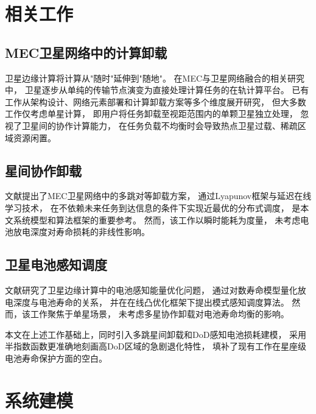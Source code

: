 \documentclass[a4paper,11pt]{article}
\begin{document}
\section{相关工作}
\label{sec:related}

\subsection{MEC卫星网络中的计算卸载}

卫星边缘计算将计算从"随时"延伸到"随地"。
在MEC与卫星网络融合的相关研究中，
卫星逐步从单纯的传输节点演变为直接处理计算任务的在轨计算平台。
已有工作从架构设计、网络元素部署和计算卸载方案等多个维度展开研究，
但大多数工作仅考虑单星计算，
即用户将任务卸载至视距范围内的单颗卫星独立处理，
忽视了卫星间的协作计算能力，
在任务负载不均衡时会导致热点卫星过载、稀疏区域资源闲置。

\subsection{星间协作卸载}

文献\cite{zhang2024mhspo}提出了MEC卫星网络中的多跳对等卸载方案，
通过Lyapunov框架与延迟在线学习技术，
在不依赖未来任务到达信息的条件下实现近最优的分布式调度，
是本文系统模型和算法框架的重要参考。
然而，该工作以瞬时能耗为度量，
未考虑电池放电深度对寿命损耗的非线性影响。

\subsection{卫星电池感知调度}

文献\cite{chen2025tasri}研究了卫星边缘计算中的电池感知能量优化问题，
通过对数寿命模型量化放电深度与电池寿命的关系，
并在在线凸优化框架下提出模式感知调度算法。
然而，该工作聚焦于单星场景，
未考虑多星协作卸载对电池寿命均衡的影响。

本文在上述工作基础上，同时引入多跳星间卸载和DoD感知电池损耗建模，
采用半指数函数更准确地刻画高DoD区域的急剧退化特性，
填补了现有工作在星座级电池寿命保护方面的空白。

\section{系统建模}
\label{sec:system_model}
\end{document}

